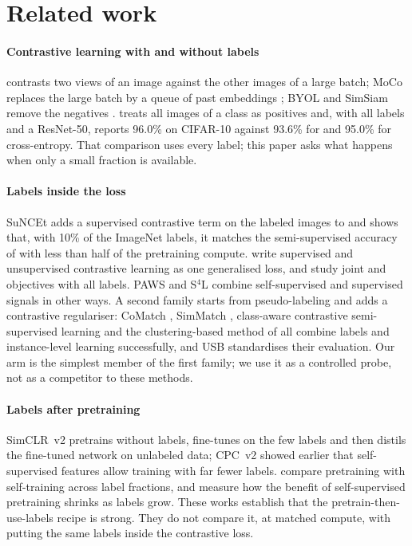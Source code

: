 \section{Related work}
\label{sec:related}

\paragraph{Contrastive learning with and without labels}
\simclr \citep{chen2020simclr} contrasts two views of an image against the other images of a large batch;
MoCo replaces the large batch by a queue of past embeddings \citep{he2020moco,chen2020mocov2}; BYOL and
SimSiam remove the negatives \citep{grill2020byol,chen2021simsiam}. \supcon \citep{khosla2020supcon} treats all
images of a class as positives and, with all labels and a ResNet-50, reports 96.0\% on CIFAR-10 against
93.6\% for \simclr and 95.0\% for cross-entropy. That comparison uses every label; this paper asks what
happens when only a small fraction is available.

\paragraph{Labels inside the loss}
SuNCEt \citep{assran2020suncet} adds a supervised contrastive term on the labeled images to \simclr and
shows that, with 10\% of the ImageNet labels, it matches the semi-supervised accuracy of \simclr with less
than half of the pretraining compute. \citet{inoue2020semi} write supervised and unsupervised contrastive
learning as one generalised loss, and \citet{islam2021broad} study joint \simclr and \supcon objectives with
all labels. PAWS \citep{assran2021paws} and S$^4$L \citep{zhai2019s4l} combine self-supervised and supervised
signals in other ways. A second family starts from pseudo-labeling and adds a contrastive regulariser:
CoMatch \citep{li2021comatch}, SimMatch \citep{zheng2022simmatch}, class-aware contrastive semi-supervised
learning \citep{yang2022classaware} and the clustering-based method of \citet{fini2023semi} all combine labels
and instance-level learning successfully, and USB \citep{wang2022usb} standardises their evaluation. Our
\union arm is the simplest member of the first family; we use it as a controlled probe, not as a
competitor to these methods.

\paragraph{Labels after pretraining}
SimCLR~v2 \citep{chen2020simclrv2} pretrains without labels, fine-tunes on the few labels and then distils
the fine-tuned network on unlabeled data; CPC~v2 \citep{henaff2020data} showed earlier that self-supervised
features allow training with far fewer labels. \citet{zoph2020rethinking} compare pretraining with
self-training across label fractions, and \citet{newell2020useful} measure how the benefit of
self-supervised pretraining shrinks as labels grow. These works establish that the pretrain-then-use-labels
recipe is strong. They do not compare it, at matched compute, with putting the same labels inside the
contrastive loss.

